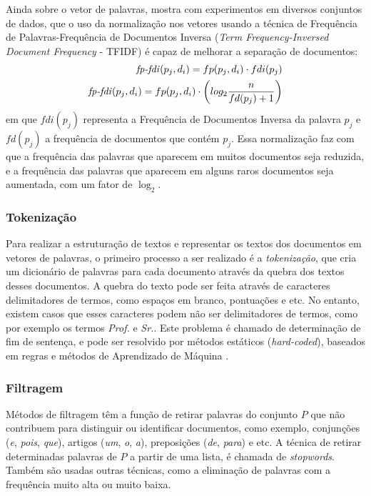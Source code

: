 \documentclass[normaltoc, espacoumemeio, pnumromarab,ruledheader]{abnt}
\begin{document}
	Ainda sobre o vetor de palavras,  mostra com experimentos em diversos conjuntos de dados, que o uso da normalização nos vetores usando a técnica de Frequência de Palavras-Frequência de Documentos Inversa (\textit{Term Frequency-Inversed Document Frequency} - TFIDF) é capaz de melhorar a separação de documentos:
	\begin{equation}
	\begin{split}
		\text{\textit{fp-fdi}}(p_j, d_i) = fp(p_j, d_i) \cdot fdi(p_j) \\
		\text{\textit{fp-fdi}}(p_j, d_i) = fp(p_j, d_i) \cdot \left( log_{2} \frac{n}{fd(p_j) + 1} \right)
	\end{split}
	\end{equation}
	em que $fdi(p_j)$ representa a Frequência de Documentos Inversa da palavra $p_j$ e $fd(p_j)$ a frequência de documentos que contém $p_j$. Essa normalização faz com que a frequência das palavras que aparecem em muitos documentos seja reduzida, e a frequência das palavras que aparecem em alguns raros documentos seja aumentada, com um fator de $\log_{2}$.

	\subsubsection{Tokenização}

	Para realizar a estruturação de textos e representar os textos dos documentos em vetores de palavras, o primeiro processo a ser realizado é a \textit{tokenização}, que cria um dicionário de palavras para cada documento através da quebra dos textos desses documentos. A quebra do texto pode ser feita através de caracteres delimitadores de termos, como espaços em branco, pontuações e etc. No entanto, existem casos que esses caracteres podem não ser delimitadores de termos, como por exemplo os termos \textit{Prof.} e \textit{Sr.}. Este problema é chamado de determinação de fim de sentença, e pode ser resolvido por métodos estáticos (\textit{hard-coded}), baseados em regras e métodos de Aprendizado de Máquina \cite{Weiss2010}.

	\subsubsection{Filtragem}

	Métodos de filtragem têm a função de retirar palavras do conjunto $P$ que não contribuem para distinguir ou identificar documentos, como exemplo, conjunções (\textit{e}, \textit{pois}, \textit{que}), artigos (\textit{um}, \textit{o}, \textit{a}), preposições (\textit{de}, \textit{para}) e etc.
	A técnica de retirar determinadas palavras de $P$ a partir de uma lista, é chamada de \textit{stopwords}.
	Também são usadas outras técnicas, como a eliminação de palavras com a frequência muito alta ou muito baixa.
\end{document}
